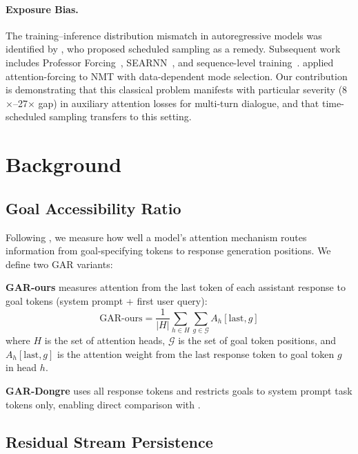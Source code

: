 \documentclass[11pt,a4paper]{article}
\begin{document}
\paragraph{Exposure Bias.}
The training--inference distribution mismatch in autoregressive models was identified by \citet{bengio2015scheduled}, who proposed scheduled sampling as a remedy. Subsequent work includes Professor Forcing~\cite{lamb2016professor}, SEARNN~\cite{leblond2018searnn}, and sequence-level training~\cite{ranzato2016sequence,wiseman2016sequence}. \citet{dou2022parallel} applied attention-forcing to NMT with data-dependent mode selection. Our contribution is demonstrating that this classical problem manifests with particular severity (8$\times$--27$\times$ gap) in auxiliary attention losses for multi-turn dialogue, and that time-scheduled sampling transfers to this setting.

\section{Background}

\subsection{Goal Accessibility Ratio}

Following \citet{dongre2026gar}, we measure how well a model's attention mechanism routes information from goal-specifying tokens to response generation positions. We define two GAR variants:

\textbf{GAR-ours} measures attention from the last token of each assistant response to goal tokens (system prompt + first user query):
\begin{equation}
\text{GAR-ours} = \frac{1}{|H|} \sum_{h \in H} \sum_{g \in \mathcal{G}} A_h[\text{last}, g]
\end{equation}
where $H$ is the set of attention heads, $\mathcal{G}$ is the set of goal token positions, and $A_h[\text{last}, g]$ is the attention weight from the last response token to goal token $g$ in head $h$.

\textbf{GAR-Dongre} uses all response tokens and restricts goals to system prompt task tokens only, enabling direct comparison with \citet{dongre2026gar}.

\subsection{Residual Stream Persistence}
\end{document}
